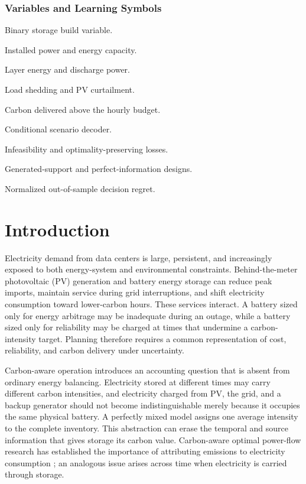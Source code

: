 \documentclass[times]{elsarticle}
\newenvironment{manuscriptdescription}
  {\begin{description}[style=multiline,leftmargin=4.8cm,labelwidth=4.5cm,align=left]}
  {\end{description}}
\begin{document}
\subsubsection*{Variables and Learning Symbols}
\begin{manuscriptdescription}
\item[$u^{\mathrm{es}}$] Binary storage build variable.
\item[$P^{\mathrm{cap}},E^{\mathrm{cap}}$] Installed power and energy capacity.
\item[$e_{s,k,t},P^{\mathrm{dc}}_{s,k,t}$] Layer energy and discharge power.
\item[$P^{\mathrm{shed}}_{s,t},P^{\mathrm{curt}}_{s,t}$] Load shedding and PV curtailment.
\item[$\Xi_{s,t}$] Carbon delivered above the hourly budget.
\item[$G_\theta$] Conditional scenario decoder.
\item[$L_{\mathrm{IPL}},L_{\mathrm{OPL}}$] Infeasibility and optimality-preserving losses.
\item[$\widehat{\bm y},\bm y^{\mathrm{PI}}$] Generated-support and perfect-information designs.
\item[$R$] Normalized out-of-sample decision regret.
\end{manuscriptdescription}

\section{Introduction}
\label{sec:introduction}

Electricity demand from data centers is large, persistent, and increasingly
exposed to both energy-system and environmental constraints. Behind-the-meter
photovoltaic (PV) generation and battery energy storage can reduce peak imports,
maintain service during grid interruptions, and shift electricity consumption
toward lower-carbon hours. These services interact. A battery sized only for
energy arbitrage may be inadequate during an outage, while a battery sized only
for reliability may be charged at times that undermine a carbon-intensity
target. Planning therefore requires a common representation of cost,
reliability, and carbon delivery under uncertainty.

Carbon-aware operation introduces an accounting question that is absent from
ordinary energy balancing. Electricity stored at different times may carry
different carbon intensities, and electricity charged from PV, the grid, and a
backup generator should not become indistinguishable merely because it occupies
the same physical battery. A perfectly mixed model assigns one average
intensity to the complete inventory. This abstraction can erase the temporal
and source information that gives storage its carbon value. Carbon-aware
optimal power-flow research has established the importance of attributing
emissions to electricity consumption \cite{chen2025copf}; an analogous issue
arises across time when electricity is carried through storage.
\end{document}
